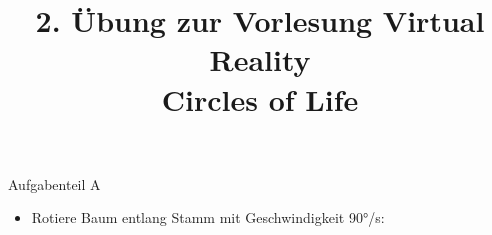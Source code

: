 \documentclass{beamer}
\author[Jan Niclas Ruppenthal, Michael Feldmann, Philipp Geier]{}
\title[]{2. Übung zur Vorlesung
Virtual Reality\\ Circles of Life}
\institute[Universität Trier]{}
\date[06. Mai 2024]{}
\begin{document}
{
  \begin{frame}
    \maketitle
  \end{frame}
}
    
	


\begin{frame}{Aufgabenteil A}
\begin{itemize}
\item Rotiere Baum entlang Stamm mit Geschwindigkeit 90°/s:
\end{itemize}
\begin{figure}
    \centering
\end{figure}
\end{frame}
\end{document}
